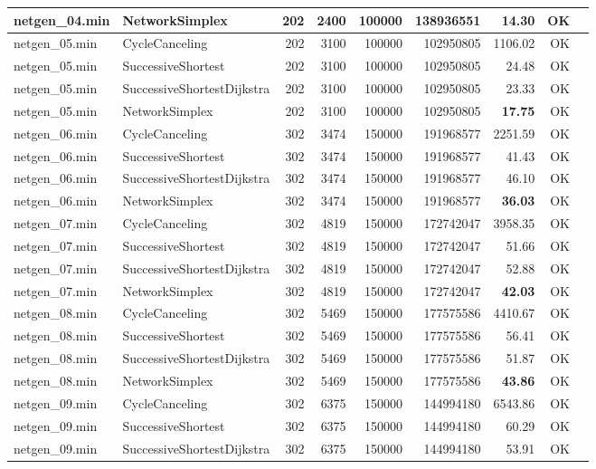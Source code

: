 \begin{longtable}{llrrrrrrl}
netgen\_04.min & NetworkSimplex & 202 & 2400 & 100000 & 138936551 & \textbf{14.30} & OK \\
\midrule
netgen\_05.min & CycleCanceling & 202 & 3100 & 100000 & 102950805 & 1106.02 & OK \\
netgen\_05.min & SuccessiveShortest & 202 & 3100 & 100000 & 102950805 & 24.48 & OK \\
netgen\_05.min & SuccessiveShortestDijkstra & 202 & 3100 & 100000 & 102950805 & 23.33 & OK \\
netgen\_05.min & NetworkSimplex & 202 & 3100 & 100000 & 102950805 & \textbf{17.75} & OK \\
\midrule
netgen\_06.min & CycleCanceling & 302 & 3474 & 150000 & 191968577 & 2251.59 & OK \\
netgen\_06.min & SuccessiveShortest & 302 & 3474 & 150000 & 191968577 & 41.43 & OK \\
netgen\_06.min & SuccessiveShortestDijkstra & 302 & 3474 & 150000 & 191968577 & 46.10 & OK \\
netgen\_06.min & NetworkSimplex & 302 & 3474 & 150000 & 191968577 & \textbf{36.03} & OK \\
\midrule
netgen\_07.min & CycleCanceling & 302 & 4819 & 150000 & 172742047 & 3958.35 & OK \\
netgen\_07.min & SuccessiveShortest & 302 & 4819 & 150000 & 172742047 & 51.66 & OK \\
netgen\_07.min & SuccessiveShortestDijkstra & 302 & 4819 & 150000 & 172742047 & 52.88 & OK \\
netgen\_07.min & NetworkSimplex & 302 & 4819 & 150000 & 172742047 & \textbf{42.03} & OK \\
\midrule
netgen\_08.min & CycleCanceling & 302 & 5469 & 150000 & 177575586 & 4410.67 & OK \\
netgen\_08.min & SuccessiveShortest & 302 & 5469 & 150000 & 177575586 & 56.41 & OK \\
netgen\_08.min & SuccessiveShortestDijkstra & 302 & 5469 & 150000 & 177575586 & 51.87 & OK \\
netgen\_08.min & NetworkSimplex & 302 & 5469 & 150000 & 177575586 & \textbf{43.86} & OK \\
\midrule
netgen\_09.min & CycleCanceling & 302 & 6375 & 150000 & 144994180 & 6543.86 & OK \\
netgen\_09.min & SuccessiveShortest & 302 & 6375 & 150000 & 144994180 & 60.29 & OK \\
netgen\_09.min & SuccessiveShortestDijkstra & 302 & 6375 & 150000 & 144994180 & 53.91 & OK \\

\end{longtable}

